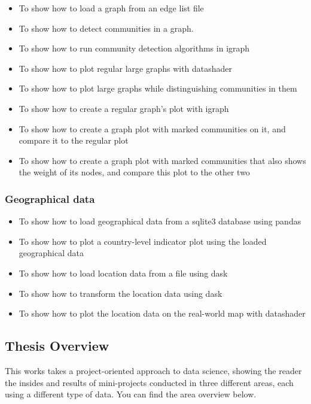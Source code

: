 \documentclass[12pt, a4paper]{article}
\begin{document}
\begin{itemize}
\item To show how to load a graph from an edge list file
\item To show how to detect communities in a graph.
\item To show how to run community detection algorithms in igraph
\item To show how to plot regular large graphs with datashader
\item To show how to plot large graphs while distinguishing communities in them
\item To show how to create a regular graph's plot with igraph
\item To show how to create a graph plot with marked communities on it, and compare it to the regular plot
\item To show how to create a graph plot with marked communities that also shows the weight of its nodes, and compare this plot to the other two
\end{itemize}

\subsubsection{Geographical data}

\begin{itemize}
\item To show how to load geographical data from a sqlite3 database using pandas
\item To show how to plot a country-level indicator plot using the loaded geographical data
\item To show how to load location data from a file using dask
\item To show how to transform the location data using dask
\item To show how to plot the location data on the real-world map with datashader
\end{itemize}


\subsection{Thesis Overview}
This works takes a project-oriented approach to data science, showing the reader the insides and results of mini-projects conducted in three different areas, each using a different type of data. You can find the area overview below.
\end{document}
